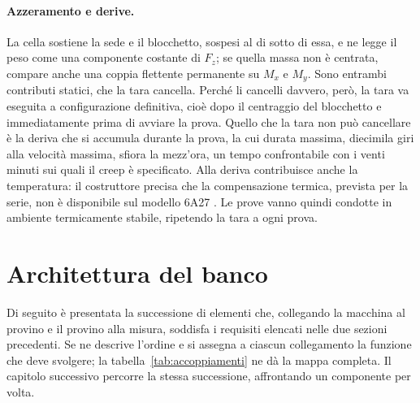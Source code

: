 \paragraph{Azzeramento e derive.}
La cella sostiene la sede e il blocchetto, sospesi al di sotto di essa, e ne
legge il peso come una componente costante di $F_z$; se quella massa non è
centrata, compare anche una coppia flettente permanente su $M_x$ e $M_y$. Sono
entrambi contributi statici, che la tara cancella. Perché li cancelli davvero,
però, la tara va eseguita a configurazione definitiva, cioè dopo il centraggio
del blocchetto e immediatamente prima di avviare la prova. Quello che la tara non può cancellare è la deriva che si
accumula durante la prova, la cui durata massima, diecimila giri alla velocità
massima, sfiora la mezz'ora, un tempo confrontabile con i venti minuti sui quali
il creep è specificato. Alla deriva contribuisce anche la temperatura: il
costruttore precisa che la compensazione termica, prevista per la serie, non è
disponibile sul modello 6A27 \cite{interface6a}. Le prove vanno quindi condotte
in ambiente termicamente stabile, ripetendo la tara a ogni prova.

\section{Architettura del banco}
\label{sec:architettura}

Di seguito è presentata la successione di elementi che, collegando la macchina al
provino e il provino alla misura, soddisfa i requisiti elencati nelle due sezioni
precedenti. Se ne descrive l'ordine e si assegna a ciascun collegamento la
funzione che deve svolgere; la tabella~\ref{tab:accoppiamenti} ne dà la mappa
completa. Il capitolo successivo percorre la stessa successione, affrontando un
componente per volta.

